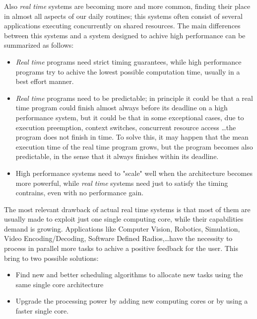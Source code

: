 \documentclass[a4paper,11pt,oneside]{book}
\begin{document}
Also \emph{real time} systems are becoming more and more common, finding their place in almost all aspects of our daily routines; this systems often consist of several applications executing concurrently on shared resources. 
The main differences between this systems and a system designed to achive high performance can be summarized as follows:
\begin{itemize}
\item{ \emph{Real time} programs need strict timing guarantees, while high performance programs try to achive the lowest possible computation time, usually in a best effort manner.}
\item{\emph{Real time} programs need to be predictable; in principle it could be that a real time program could finish almost always before its deadline on a high performance system, but it could be that in some exceptional cases, due to execution preemption, context switches, concurrent resource access \dots the program does not finish in time. To solve this, it may happen that the mean execution time of the real time program grows, but the program becomes also predictable, in the sense that it always finishes within its deadline.}
\item{ High performance systems need to "scale" well when the architecture becomes more powerful, while \emph{real time} systems need just to satisfy the timing contrains, even with no performance gain.}

\end{itemize}

The most relevant drawback of actual real time systems is that most of them are usually made to exploit just one single computing core, while their capabilities demand is growing. Applications like Computer Vision, Robotics, Simulation, Video Encoding/Decoding, Software Defined Radios,\dots have the necessity to process in parallel more tasks to achive a positive feedback for the user. This bring to two possible solutions:
\begin{itemize}
\item{Find new and better scheduling algorithms to allocate new tasks using the same single core architecture}
\item{Upgrade the processing power by adding new computing cores or by using a faster single core.}
\end{itemize}
\end{document}
